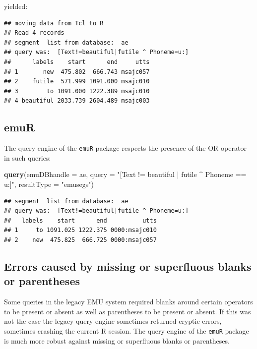 \documentclass[]{book}
\newenvironment{Shaded}{\begin{snugshade}}{\end{snugshade}}
\newcommand{\DataTypeTok}[1]{\textcolor[rgb]{0.13,0.29,0.53}{#1}}
\newcommand{\KeywordTok}[1]{\textcolor[rgb]{0.13,0.29,0.53}{\textbf{#1}}}
\newcommand{\NormalTok}[1]{#1}
\newcommand{\StringTok}[1]{\textcolor[rgb]{0.31,0.60,0.02}{#1}}
\theoremstyle{definition}
\theoremstyle{definition}
\theoremstyle{definition}
\theoremstyle{remark}
\begin{document}
yielded:

\begin{verbatim}
## moving data from Tcl to R
## Read 4 records
## segment  list from database:  ae
## query was:  [Text!=beautiful|futile ^ Phoneme=u:]
##      labels    start      end     utts
## 1       new  475.802  666.743 msajc057
## 2    futile  571.999 1091.000 msajc010
## 3        to 1091.000 1222.389 msajc010
## 4 beautiful 2033.739 2604.489 msajc003
\end{verbatim}

\hypertarget{emur-1}{%
\subsection{emuR}\label{emur-1}}

The query engine of the \texttt{emuR} package respects the presence of
the OR operator in such queries:

\begin{Shaded}
\begin{Highlighting}[]
\KeywordTok{query}\NormalTok{(}\DataTypeTok{emuDBhandle =}\NormalTok{ ae,}
      \DataTypeTok{query =} \StringTok{"[Text != beautiful | futile ^ Phoneme == u:]"}\NormalTok{,}
      \DataTypeTok{resultType =} \StringTok{"emusegs"}\NormalTok{)}
\end{Highlighting}
\end{Shaded}

\begin{verbatim}
## segment  list from database:  ae
## query was:  [Text!=beautiful|futile ^ Phoneme=u:]
##   labels    start      end          utts
## 1     to 1091.025 1222.375 0000:msajc010
## 2    new  475.825  666.725 0000:msajc057
\end{verbatim}

\hypertarget{errors-caused-by-missing-or-superfluous-blanks-or-parentheses}{%
\subsection{Errors caused by missing or superfluous blanks or
parentheses}\label{errors-caused-by-missing-or-superfluous-blanks-or-parentheses}}

Some queries in the legacy EMU system required blanks around certain
operators to be present or absent as well as parentheses to be present
or absent. If this was not the case the legacy query engine sometimes
returned cryptic errors, sometimes crashing the current R session. The
query engine of the \texttt{emuR} package is much more robust against
missing or superfluous blanks or parentheses.
\end{document}

